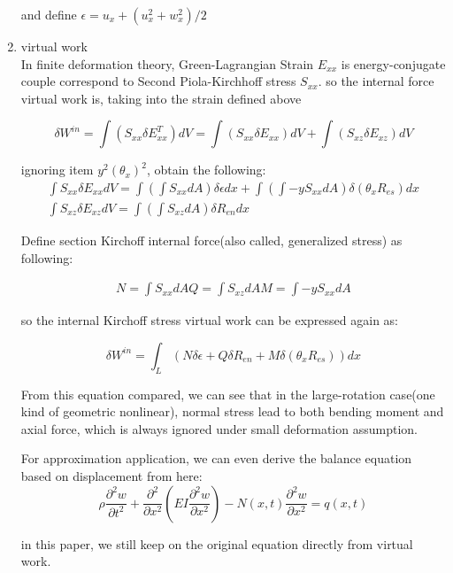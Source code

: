 \documentclass[11pt]{article}
\begin{document}
\begin{enumerate}
and define $ \epsilon =  u_x + ( u_x^2 + w_x^2)/2 $ 


\item {virtual work } \\
In finite deformation theory, Green-Lagrangian Strain $E_{xx}$ is energy-conjugate couple correspond to Second Piola-Kirchhoff stress $S_{xx}$. so the internal force virtual work is, taking into the strain defined above

$$ \delta W^{in} = \int (S_{xx} \delta E_{xx}^T) dV =  \int ( S_{xx} \delta E_{xx})dV + \int (S_{xz} \delta E_{xz} )dV $$

ignoring item $y^2(\theta_x)^2$, obtain the following: 
\begin{subequations}
	\begin{align}
	\int S_{xx} \delta E_{xx} dV = \int (\int S_{xx} dA) \delta \epsilon dx + \int (\int-y S_{xx}dA) \delta(\theta_x R_{es}) dx \\
	\int S_{xz} \delta E_{xz} dV = \int (\int S_{xz} dA) \delta R_{en} dx
	\end{align}
\end{subequations}

Define section Kirchoff internal force(also called, generalized stress) as following:

\begin{subequations}
	\begin{align}
	N = \int S_{xx} dA
	Q = \int S_{xz} dA
	M = \int -y S_{xx} dA
	\end{align}
\end{subequations}

so the internal Kirchoff stress virtual work can be expressed again as:

$$ \delta W^{in} = \int_L(N \delta \epsilon + Q \delta R_{en} + M \delta (\theta_x R_{es}) ) dx $$

From this equation compared, we can see that in the large-rotation case(one kind of geometric nonlinear), normal stress lead to both bending moment and axial force, which is always ignored under small deformation assumption.

For approximation application, we can even derive the balance equation based on displacement from here:
$$ \rho \frac{\partial^2 w}{\partial t^2} + \frac{\partial^2}{\partial x^2}( EI \frac{\partial^2 w}{\partial x^2}) - N(x,t) \frac{\partial^2 w}{\partial x^2} = q(x,t) $$

in this paper, we still keep on the original equation directly from virtual work. 


\end{enumerate}
\end{document}
